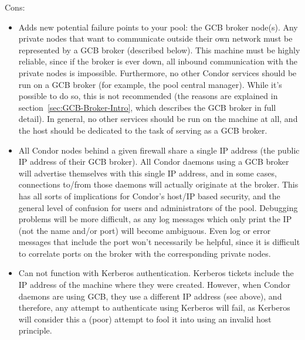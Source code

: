 Cons:
\begin{itemize}

\item Adds new potential failure points to your pool: the GCB broker
  node(s).
  Any private nodes that want to communicate outside their own network
  must be represented by a GCB broker (described below).
  This machine must be highly reliable, since if the broker is ever
  down, all inbound communication with the private nodes is
  impossible.
  Furthermore, no other Condor services should be run on a GCB broker
  (for example, the pool central manager).
  While it's possible to do so, this is not recommended (the reasons
  are explained in section~\ref{sec:GCB-Broker-Intro}, which describes
  the GCB broker in full detail). 
  In general, no other services should be run on the machine at all,
  and the host should be dedicated to the task of serving as a GCB
  broker.

\item All Condor nodes behind a given firewall share a single IP
  address (the public IP address of their GCB broker).
  All Condor daemons using a GCB broker will advertise themselves with
  this single IP address, and in some cases, connections to/from those
  daemons will actually originate at the broker.
  This has all sorts of implications for Condor's host/IP based
  security, and the general level of confusion for users and
  administrators of the pool.
  Debugging problems will be more difficult, as any log messages which 
  only print the IP (not the name and/or port) will become ambiguous.
  Even log or error messages that include the port won't necessarily
  be helpful, since it is difficult to correlate ports on the broker
  with the corresponding private nodes.
  
\item Can not function with Kerberos authentication.
  Kerberos tickets include the IP address of the machine where they
  were created.
  However, when Condor daemons are using GCB, they use a different IP
  address (see above), and therefore, any attempt to authenticate
  using Kerberos will fail, as Kerberos will consider this a (poor)
  attempt to fool it into using an invalid host principle.


\end{itemize}
